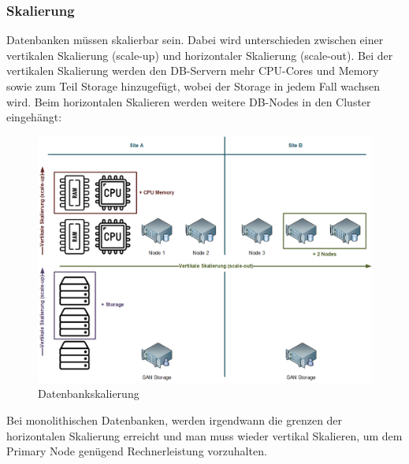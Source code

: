 
\subsubsection{Skalierung}
Datenbanken müssen skalierbar sein.
Dabei wird unterschieden zwischen einer vertikalen Skalierung (scale-up) und horizontaler Skalierung (scale-out).
Bei der vertikalen Skalierung werden den DB-Servern mehr CPU-Cores und Memory sowie zum Teil Storage hinzugefügt, wobei der Storage in jedem Fall wachsen wird.
Beim horizontalen Skalieren werden weitere DB-Nodes in den Cluster eingehängt\cite{IZSGZLVT}:
\begin{figure}[H]
    \centering
    \includegraphics[width=1\linewidth]{source/implementation/evaluation/excursus_architecture/Skalierung}
    \caption{Datenbankskalierung}
    \label{fig:Datenbankskalierung}
\end{figure}

Bei monolithischen Datenbanken, werden irgendwann die grenzen der horizontalen Skalierung erreicht und man muss wieder vertikal Skalieren, um dem Primary Node genügend Rechnerleistung vorzuhalten.